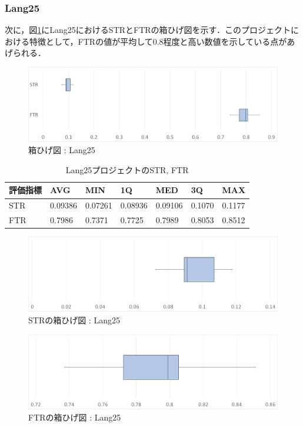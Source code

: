 \documentclass[uplatex,dvipdfmx,a4paper]{jsarticle}
\begin{document}
\subsubsection{Lang25}
次に，図\ref{fig:Lang25_boxplot}にLang25におけるSTRとFTRの箱ひげ図を示す．このプロジェクトにおける特徴として，FTRの値が平均して0.8程度と高い数値を示している点があげられる．
\begin{figure}[t]
  \centering
  \includegraphics[width=\linewidth]{fig/Lang25_boxplot.png}
  \caption{箱ひげ図 : Lang25}
  \label{fig:Lang25_boxplot}
\end{figure}
\begin{table}[b]
  \centering
  \caption{Lang25プロジェクトのSTR, FTR}
  \label{tab:Lang25}
  \begin{tabular}{l|llllll} \hline\hline
    評価指標 & AVG         & MIN & 1Q & MED & 3Q & MAX   \\\hline
    STR & 0.09386 & 0.07261 & 0.08936 & 0.09106 & 0.1070 & 0.1177  \\
    FTR & 0.7986 & 0.7371 & 0.7725 & 0.7989 & 0.8053 & 0.8512 \\\hline\hline
  \end{tabular}
\end{table}
\begin{figure}[t]
  \centering
  \includegraphics[width=\linewidth]{fig/Lang25_boxplot_STR.png}
  \caption{STRの箱ひげ図 : Lang25}
  \label{fig:Lang25_boxplot_STR}
\end{figure}
\begin{figure}[t]
  \centering
  \includegraphics[width=\linewidth]{fig/Lang25_boxplot_FTR.png}
  \caption{FTRの箱ひげ図 : Lang25}
  \label{fig:Lang25_boxplot_FTR}
\end{figure}
\end{document}
